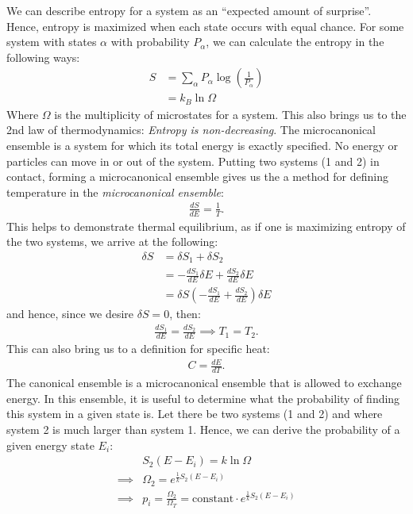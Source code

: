 \documentclass{article}
\begin{document}
We can describe entropy for a system as an ``expected amount of surprise''. Hence, entropy is maximized when each state occurs with equal chance. For some system with states $\alpha$ with probability $P_\alpha$, we can calculate the entropy in the following ways:
\begin{align*}
  S &= \sum_{\alpha} P_\alpha \log \left(\frac{1}{P_\alpha}\right)\\
  &= k_B \ln \Omega
\end{align*}
Where $\Omega$ is the multiplicity of microstates for a system.
\gap
This also brings us to the 2nd law of thermodynamics: \textit{Entropy is non-decreasing}.
\gap
{}
The microcanonical ensemble is a system for which its total energy is exactly specified. No energy or particles can move in or out of the system.
\gap
Putting two systems (1 and 2) in contact, forming a microcanonical ensemble gives us the a method for defining temperature in the \textit{microcanonical ensemble}:
\begin{align*}
  \frac{dS}{dE} = \frac{1}{T}.
\end{align*}
This helps to demonstrate thermal equilibrium, as if one is maximizing entropy of the two systems, we arrive at the following:
\begin{align*}
  \delta S &= \delta S_1 + \delta S_2 \\
  &= -\frac{dS_1}{dE}\delta E + \frac{dS_2}{dE}\delta E\\
  &= \delta S \left(-\frac{dS_1}{dE} + \frac{dS_2}{dE}\right) \delta E
\end{align*}
and hence, since we desire $\delta S = 0$, then:
\begin{align*}
  \frac{dS_1}{dE} = \frac{dS_2}{dE} \implies T_1 = T_2.
\end{align*}
This can also bring us to a definition for specific heat:
\begin{align*}
  C = \frac{dE}{dT}.
\end{align*}
The canonical ensemble is a microcanonical ensemble that is allowed to exchange energy.
\gap
In this ensemble, it is useful to determine what the probability of finding this system in a given state is. Let there be two systems (1 and 2) and where system 2 is much larger than system 1. Hence, we can derive the probability of a given energy state $E_i$:
\begin{align*}
  &S_2(E-E_i) = k \ln \Omega\\
  \implies &\Omega_2 = e^{\frac{1}{k}S_2(E-E_i)}\\
  \implies &p_i = \frac{\Omega_2}{\Omega_T} = \text{constant} \cdot e^{\frac{1}{k} S_2(E-E_i)}
\end{align*}
\end{document}
